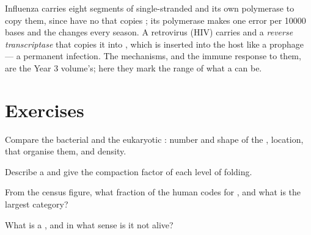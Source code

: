 \begin{example}\label{ex:b1:genomes:rna}
Influenza carries eight segments of single-stranded  and its own
polymerase to copy them, since  have no  that copies ;
its polymerase makes one error per \num{10000} bases and the 
changes every season. A retrovirus (HIV) carries  and a
\emph{reverse transcriptase} that copies it into , which is inserted
into the host  like a prophage --- a permanent infection.
The mechanisms, and the immune response to them, are the Year 3
volume's; here they mark the range of what a  can be.
\end{example}

\section{Exercises}

\begin{exercise}[$\star$]\label{exo:b1:genomes:1}
Compare the bacterial and the eukaryotic : number and shape of
the , location,  that organise them, and 
density.
\end{exercise}

\begin{exercise}[$\star$]\label{exo:b1:genomes:2}
Describe a  and give the compaction factor of each level of
 folding.
\end{exercise}

\begin{exercise}[$\star$]\label{exo:b1:genomes:3}
From the census figure, what fraction of the human  codes for
, and what is the largest category?
\end{exercise}

\begin{exercise}[$\star$]\label{exo:b1:genomes:4}
What is a , and in what sense is it not alive?
\end{exercise}

